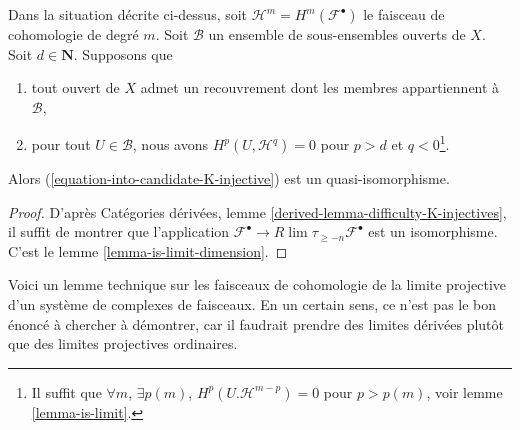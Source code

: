 \begin{lemma}

\label{lemma-K-injective}

Dans la situation décrite ci-dessus, soit $\mathcal{H}^m = H^m(\mathcal{F}^\bullet)$ le faisceau de cohomologie de degré $m$. Soit $\mathcal{B}$ un ensemble de sous-ensembles ouverts de $X$. Soit $d \in \mathbf{N}$. Supposons que

\begin{enumerate}

\item tout ouvert de $X$ admet un recouvrement dont les membres appartiennent à $\mathcal{B}$,
\item pour tout $U \in \mathcal{B}$, nous avons $H^p(U, \mathcal{H}^q) = 0$
pour $p > d$ et $q < 0$\footnote{Il suffit que
$\forall m$, $\exists p(m)$, $H^p(U. \mathcal{H}^{m - p}) = 0$ pour
$p > p(m)$, voir lemme \ref{lemma-is-limit}.}.

\end{enumerate}

Alors (\ref{equation-into-candidate-K-injective}) est un quasi-isomorphisme.

\end{lemma}

\begin{proof}
D'après Catégories dérivées, lemme \ref{derived-lemma-difficulty-K-injectives}, il suffit de montrer que l'application $\mathcal{F}^\bullet \to R\lim \tau_{\geq -n} \mathcal{F}^\bullet$ est un isomorphisme. C'est le lemme \ref{lemma-is-limit-dimension}.
\end{proof}

\noindent
Voici un lemme technique sur les faisceaux de cohomologie de la limite projective d'un système de complexes de faisceaux. En un certain sens, ce n'est pas le bon énoncé à chercher à démontrer, car il faudrait prendre des limites dérivées plutôt que des limites projectives ordinaires.

